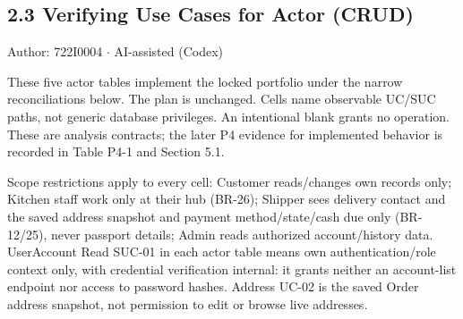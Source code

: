 \subsection*{2.3 Verifying Use Cases for Actor (CRUD)}
Author: 722I0004 \ensuremath{\cdot} AI-assisted (Codex)

These five actor tables implement the locked portfolio under the narrow reconciliations below. The plan is unchanged. Cells name observable UC/SUC paths, not generic database privileges. An intentional blank grants no operation. These are analysis contracts; the later P4 evidence for implemented behavior is recorded in Table P4-1 and Section 5.1.

Scope restrictions apply to every cell: Customer reads/changes own records only; Kitchen staff work only at their hub (BR-26); Shipper sees delivery contact and the saved address snapshot and payment method/state/cash due only (BR-12/25), never passport details; Admin reads authorized account/history data. UserAccount Read SUC-01 in each actor table means own authentication/role context only, with credential verification internal: it grants neither an account-list endpoint nor access to password hashes. Address UC-02 is the saved Order address snapshot, not permission to edit or browse live addresses.
